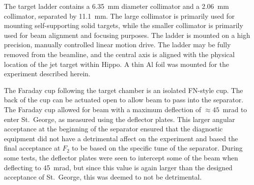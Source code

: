 The target ladder contains a 6.35~mm diameter collimator and a 2.06~mm
collimator, separated by 11.1~mm. The large collimator is primarily used
for mounting self-supporting solid targets, while the smaller collimator
is primarily used for beam alignment and focusing purposes. The ladder
is mounted on a high precision, manually controlled linear motion drive.
The ladder may be fully removed from the beamline, and the central axis
is aligned with the physical location of the jet target within Hippo. A
thin Al foil was mounted for the experiment described herein.

The Faraday cup following the target chamber is an isolated FN-style
cup. The back of the cup can be actuated open to allow beam to pass into
the separator. The Faraday cup allowed for beam with a maximum
deflection of $\approx 45$~mrad to enter St.\ George, as measured using
the deflector plates. This larger angular acceptance at the beginning of
the separator ensured that the diagnostic equipment did not have a
detrimental affect on the experiment and based the final acceptance at
$F_2$ to be based on the specific tune of the separator. During some
tests, the deflector plates were seen to intercept some of the beam when
deflecting to 45~mrad, but since this value is again larger than the
designed acceptance of St.\ George, this was deemed to not be
detrimental.
